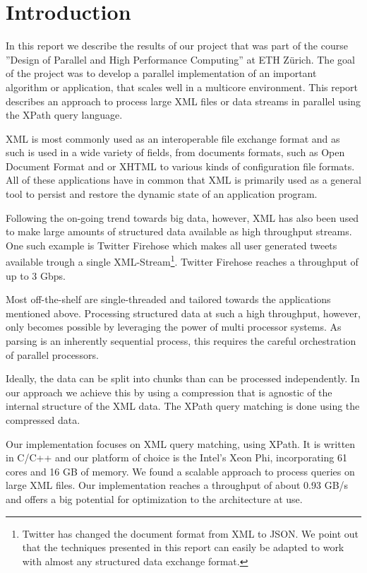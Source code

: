 \section{Introduction}\label{sec:intro}

In this report we describe the results of our project that was part of the
course ''Design of Parallel and High Performance Computing'' at ETH Z\"urich.
The goal of the project was to develop a parallel implementation of an important
algorithm or application, that scales well in a multicore environment. This
report describes an approach to process large XML files or data streams in
parallel using the XPath query language.

XML is most commonly used as an interoperable file exchange format and as such
is used in a wide variety of fields, from documents formats, such as Open
Document Format  and or XHTML  to various kinds of
configuration file formats. All of these applications have in common that XML is
primarily used as a general tool to persist and restore the dynamic state of an
application program.

Following the on-going trend towards big data, however, XML has also been used
to make large amounts of structured data available as high throughput streams.
One such example is Twitter Firehose which makes all user generated tweets
available trough a single XML-Stream\footnote{Twitter has changed the document
format from XML to JSON. We point out that the techniques presented in this
report can easily be adapted to work with almost any structured data exchange
format.}. Twitter Firehose reaches a throughput of up to 3 Gbps.

Most off-the-shelf are single-threaded and tailored towards the applications
mentioned above. Processing structured data at such a high throughput, however,
only becomes possible by leveraging the power of multi processor systems. As
parsing is an inherently sequential process, this requires the careful
orchestration of parallel processors.

Ideally, the data can be split into chunks than can be processed independently.
In our approach we achieve this by using a compression that is agnostic of the
internal structure of the XML data. The XPath query matching is done using the
compressed data.

Our implementation focuses on XML query matching, using XPath. It is written in
C/C++ and our platform of choice is the Intel's Xeon Phi, incorporating 61 cores
and 16 GB of memory. We found a scalable approach to process queries on large
XML files. Our implementation reaches a throughput of about 0.93 GB/s and offers
a big potential for optimization to the architecture at use. 

